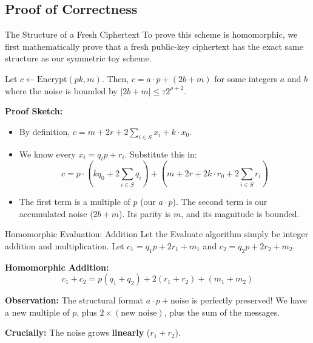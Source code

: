 \documentclass[10pt]{beamer}
\begin{document}
\subsection{Proof of Correctness}

\begin{frame}{The Structure of a Fresh Ciphertext}
    To prove this scheme is homomorphic, we first mathematically prove that a fresh public-key ciphertext has the exact same structure as our symmetric toy scheme.
    \pause
    
    \begin{lemma}
    Let $c \leftarrow \text{Encrypt}(pk, m)$. Then, $c = a\cdot p + (2b + m)$ for some integers $a$ and $b$ where the noise is bounded by $|2b+m| \le \tau 2^{\rho+2}$.
    \end{lemma}
    \pause
    
    \vspace{0.3cm}
    \textbf{Proof Sketch:}
    \begin{itemize}
        \item By definition, $c = m + 2r + 2\sum_{i \in S} x_i + k \cdot x_0$.
        \item We know every $x_i = q_i p + r_i$. Substitute this in:
        $$c = p \cdot \left(kq_0 + 2\sum_{i \in S} q_i\right) + \left(m + 2r + 2k \cdot r_0 + 2\sum_{i \in S} r_i\right)$$
        \item The first term is a multiple of $p$ (our $a \cdot p$). The second term is our accumulated noise ($2b+m$). Its parity is $m$, and its magnitude is bounded.
    \end{itemize}
\end{frame}

\begin{frame}{Homomorphic Evaluation: Addition}
    Let the Evaluate algorithm simply be integer addition and multiplication. 
    Let $c_1 = q_1 p + 2r_1 + m_1$ and $c_2 = q_2 p + 2r_2 + m_2$.
    \pause

    \vspace{0.3cm}
    \textbf{Homomorphic Addition:}
    $$c_1 + c_2 = p(q_1 + q_2) + 2(r_1 + r_2) + (m_1 + m_2)$$
    \pause
    
    \vspace{0.3cm}
    \textbf{Observation:}
    The structural format $a\cdot p + \text{noise}$ is perfectly preserved! We have a new multiple of $p$, plus $2 \times (\text{new noise})$, plus the sum of the messages. 
    
    \vspace{0.2cm}
    \textbf{Crucially:} The noise grows \textbf{linearly} ($r_1 + r_2$).
\end{frame}
\end{document}
